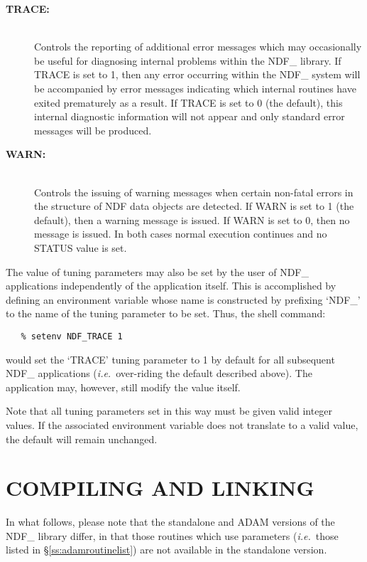 \documentclass[twoside,11pt]{article}
\newcommand{\xref}[3]{#1}
\newcommand{\xlabel}[1]{}
\newcommand{\st}[1]{{\em{#1}}}
\begin{document}
\begin{description}
\item[{\bf TRACE:}]\mbox{}\\
Controls the reporting of additional error messages which may
occasionally be useful for diagnosing internal problems within the
NDF\_ library. If TRACE is set to 1, then any error occurring within
the NDF\_ system will be accompanied by error messages indicating
which internal routines have exited prematurely as a result. If TRACE
is set to 0 (the default), this internal diagnostic information will
not appear and only standard error messages will be produced.

\item[{\bf WARN:}]\mbox{}\\
Controls the issuing of warning messages when certain non-fatal errors
in the structure of NDF data objects are detected. If WARN is set to 1
(the default), then a warning message is issued. If WARN is set to 0,
then no message is issued.  In both cases normal execution continues
and no STATUS value is set.

\end{description}

The value of tuning parameters may also be set by the user of NDF\_
applications independently of the application itself. This is
accomplished by defining an environment variable whose name is
constructed by prefixing `NDF\_' to the name of the tuning parameter
to be set. Thus, the shell command:

\small
\begin{verbatim}
   % setenv NDF_TRACE 1
\end{verbatim}
\normalsize

would set the `TRACE' tuning parameter to 1 by default for all
subsequent NDF\_ applications (\st{i.e.}\ over-riding the default
described above). The application may, however, still modify the value
itself.

Note that all tuning parameters set in this way must be given valid
integer values. If the associated environment variable does not
translate to a valid value, the default will remain unchanged.

\section{\xlabel{compiling_and_linking}\label{ss:compilingandlinking}COMPILING AND LINKING}

In what follows, please note that the standalone and
\xref{ADAM}{sg4}{} versions of
the NDF\_ library differ, in that those routines which use parameters
(\st{i.e.}\ those listed in \S\ref{ss:adamroutinelist}) are not
available in the standalone version.
\end{document}
